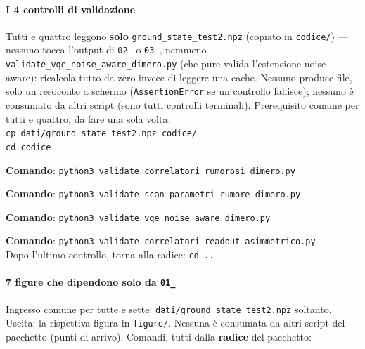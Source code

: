 \documentclass[11pt,a4paper]{article}
\newcommand{\code}[1]{\texttt{\small #1}}
\begin{document}
\paragraph{I 4 controlli di validazione} Tutti e quattro leggono
\textbf{solo} \code{ground\_state\_test2.npz} (copiato in
\code{codice/}) --- nessuno tocca l'output di \code{02\_} o \code{03\_},
nemmeno \code{validate\_vqe\_noise\_aware\_dimero.py} (che pure valida
l'estensione noise-aware): ricalcola tutto da zero invece di leggere una
cache. Nessuno produce file, solo un resoconto a schermo
(\code{AssertionError} se un controllo fallisce); nessuno è consumato da
altri script (sono tutti controlli terminali). Prerequisito comune per
tutti e quattro, da fare una sola volta:\\
\code{cp dati/ground\_state\_test2.npz codice/}\\
\code{cd codice}

\begin{keyeq}[title={validate\_correlatori\_rumorosi\_dimero.py}]
\textbf{Comando}: \code{python3 validate\_correlatori\_rumorosi\_dimero.py}
\end{keyeq}

\begin{keyeq}[title={validate\_scan\_parametri\_rumore\_dimero.py}]
\textbf{Comando}: \code{python3 validate\_scan\_parametri\_rumore\_dimero.py}
\end{keyeq}

\begin{keyeq}[title={validate\_vqe\_noise\_aware\_dimero.py}]
\textbf{Comando}: \code{python3 validate\_vqe\_noise\_aware\_dimero.py}
\end{keyeq}

\begin{keyeq}[title={validate\_correlatori\_readout\_asimmetrico.py}]
\textbf{Comando}: \code{python3 validate\_correlatori\_readout\_asimmetrico.py}\\
Dopo l'ultimo controllo, torna alla radice: \code{cd ..}
\end{keyeq}

\paragraph{7 figure che dipendono solo da \texttt{01\_}} Ingresso comune
per tutte e sette: \code{dati/ground\_state\_test2.npz} soltanto. Uscita:
la rispettiva figura in \code{figure/}. Nessuna è consumata da altri
script del pacchetto (punti di arrivo). Comandi, tutti dalla
\textbf{radice} del pacchetto:
\end{document}
